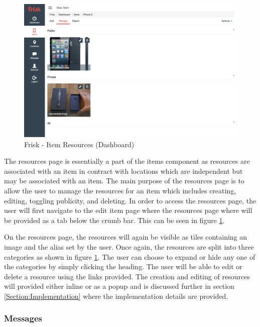 \begin{figure}[H]
	\centering
	\includegraphics[width=1.0\textwidth]{images/Frisk/Dashboard_Resources}
	\caption{Frisk - Item Resources (Dashboard)} \label{fig:Dashboard_Resources}
\end{figure}

The resources page is essentially a part of the items component as resources are associated with an item in contract with locations which are independent but may be associated with an item. The main purpose of the resources page is to allow the user to manage the resources for an item which includes creating, editing, toggling publicity, and deleting. In order to access the resources page, the user will first navigate to the edit item page where the resources page where will be provided as a tab below the crumb bar. This can be seen in figure \ref{fig:Dashboard_Resources}.

On the resources page, the resources will again be visible as tiles containing an image and the alias set by the user. Once again, the resources are split into three categories as shown in figure \ref{fig:Dashboard_Resources}. The user can choose to expand or hide any one of the categories by simply clicking the heading. The user will be able to edit or delete a resource using the links provided. The creation and editing of resources will provided either inline or as a popup and is discussed further in section \ref{Section:Implementation} where the implementation details are provided.

\subsubsection{Messages}

